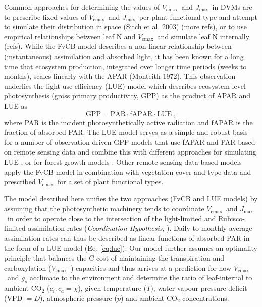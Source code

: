 \documentclass{myreport}
\newcommand{\vcmax}{$V_{\text{cmax}}$}
\newcommand{\jmax}{$J_{\text{max}}$}
\begin{document}
Common approaches for determining the values of \vcmax\ and \jmax\ in DVMs are to prescribe fixed values of \vcmax\ and \jmax\  per plant functional type and attempt to simulate their distribution in space (Sitch et al. 2003) (more refs), or to use empirical relationships between leaf N and \vcmax\ and simulate leaf N internally (refs). While the FvCB model describes a non-linear relationship between (instantaneous) assimilation and absorbed light, it has been known for a long time that ecosystem production, integrated over longer time periods (weeks to months), scales linearly with the APAR (Monteith 1972). This observation underlies the light use efficiency (LUE) model which describes ecosystem-level photosynthesis (gross primary productivity, GPP) as the product of APAR and LUE as
\begin{equation}
\label{eq:luemodel}
\text{GPP} = \text{PAR} \cdot \text{fAPAR} \cdot \text{LUE} \;,
\end{equation}
where PAR is the incident photosynthetically active radiation and fAPAR is the fraction of absorbed PAR. The LUE model serves as a simple and robust basis for a number of observation-driven GPP models that use fAPAR and PAR based on remote sensing data and combine this with different approaches for simulating LUE \citep{running04, zhang17scidat, field95rse}, or for forest growth models \citep{landsberg97fem}. Other remote sensing data-based models \citep{jiang16rse} apply the FvCB model in combination with vegetation cover and type data and prescribed \vcmax\ for a set of plant functional types.

The model described here unifies the two approaches (FvCB and LUE models) by assuming that the photosynthetic machinery tends to coordinate \vcmax\ and \jmax\  in order to operate close to the intersection of the light-limited and Rubisco-limited assimilation rates (\textit{Coordination Hypothesis}, \cite{maire12po}). Daily-to-monthly average assimilation rates can thus be described as linear functions of absorbed PAR in the form of a LUE model (Eq. \ref{eq:lue}). Our model further assumes an optimality principle that balances the C cost of maintaining the transpiration and carboxylation (\vcmax\ ) capacities and thus arrives at a prediction for how \vcmax\ and $g_s$ acclimate to the environment and determine the ratio of leaf-internal to ambient CO$_2$ ($c_i:c_a = \chi$), given temperature ($T$), water vapour pressure deficit (VPD $= D$), atmospheric pressure ($p$) and ambient CO$_2$ concentrations.
\end{document}
